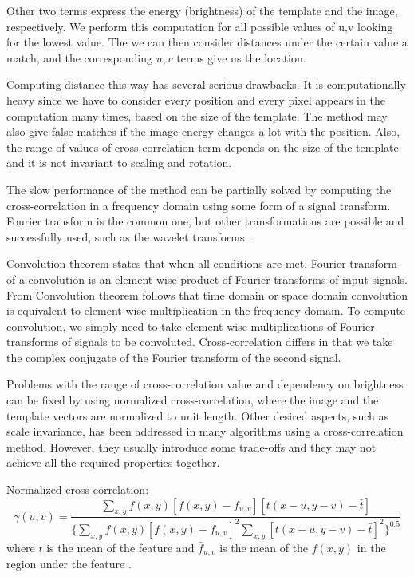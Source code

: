 Other two terms express the energy (brightness) of the template and the image, respectively. We perform this computation for all possible values of u,v looking for the lowest value. The we can then consider distances under the certain value a match, and the corresponding $u,v$ terms give us the location.

Computing distance this way has several serious drawbacks. It is computationally heavy since we have to consider every position and every pixel appears in the computation many times, based on the size of the template. The method may also give false matches if the image energy changes a lot with the position. Also, the range of values of cross-correlation term depends on the size of the template and it is not invariant to scaling and rotation. 

The slow performance of the method can be partially solved by computing the cross-correlation in a frequency domain using some form of a signal transform. Fourier transform is the common one, but other transformations are possible and successfully used, such as the wavelet transforms \cite{patternRecNN}.

Convolution theorem states that when all conditions are met, Fourier transform of a convolution is an element-wise product of Fourier transforms of input signals. From Convolution theorem follows that time domain or space domain convolution is equivalent to element-wise multiplication in the frequency domain. To compute convolution, we simply need to take element-wise multiplications of Fourier transforms of signals to be convoluted. Cross-correlation differs in that we take the complex conjugate of the Fourier transform of the second signal. 

Problems with the range of cross-correlation value and dependency on brightness can be fixed by using normalized cross-correlation, where the image and the template vectors are normalized to unit length. Other desired aspects, such as scale invariance, has been addressed in many algorithms using a cross-correlation method. However, they usually introduce some trade-offs and they may not achieve all the required properties together. 

Normalized cross-correlation:
\begin{equation*}
\gamma(u,v) = \frac{\sum_{x,y}f(x,y) [f(x,y)-\bar{f}_{u,v}][t(x-u,y-v)-\bar{t}]} {\{ \sum_{x,y}f(x,y) [f(x,y)-\bar{f}_{u,v}]^2 \sum_{x,y}[t(x-u,y-v)-\bar{t}]^2\}^{0.5}}
\end{equation*}
where $\bar{t}$ is the mean of the feature and $\bar{f}_{u,v}$ is the mean of the $f(x,y)$ in the region under the feature \cite{crossCorrLewis}.

